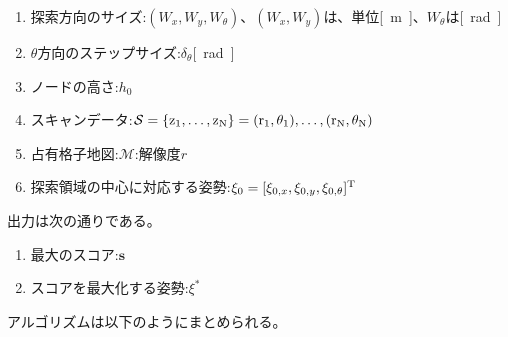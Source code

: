 \begin{enumerate}
  \item 探索方向のサイズ:$(W_x,W_y,W_\theta)$、$(W_x,W_y)$は、単位\si{[m]}、$W_{\theta}$は\si{[rad]}
  \item $\theta$方向のステップサイズ:$\delta_\theta$\si{[rad]}
  \item ノードの高さ:$h_0$
  \item スキャンデータ:$\mathcal{S}=\{\rm{z_1},\ldots,\rm{z_N}\}={(r_1,\theta_1),\ldots, (r_N,\theta_N)}$
  \item 占有格子地図:$\mathcal{M}$:解像度$r$
  \item 探索領域の中心に対応する姿勢:$\xi_0 = [\xi_{0,x},\xi_{0,y},\xi_{0,\theta}]^{\rm{T}}$
\end{enumerate}
出力は次の通りである。
\begin{enumerate}
  \item 最大のスコア:$\bm{s}$
  \item スコアを最大化する姿勢:$\xi^{*}$
\end{enumerate}
アルゴリズムは以下のようにまとめられる。
